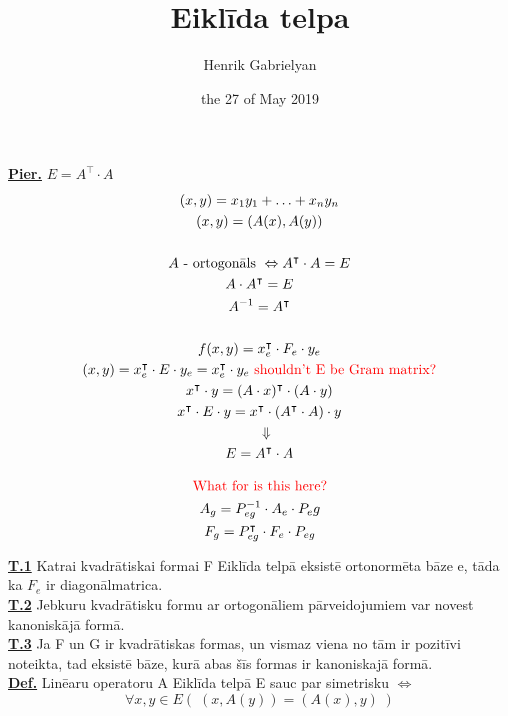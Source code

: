 \documentclass[12pt]{article}
\title{Eiklīda telpa}
\author{Henrik Gabrielyan}
\date{the 27 of May 2019}
\begin{document}
\maketitle

\textbf{\underline{Pier.}}  $E = A^{\intercal} \cdot A$
\begin{gather*}
	(x,y) = x_1y_1 + \ldots + x_ny_n  \\
	(x,y) = (A(x), A(y)) \\
	\\
	A \text{ - ortogonāls } \Leftrightarrow A^{\intercal} \cdot A = E \\ 
	A \cdot A^{\intercal} = E \\
	A^{-1} = A^{\intercal} \\
	\\
	f(x,y) = x_e^{\intercal} \cdot F_e \cdot y_e \\
	(x,y) = x_e^{\intercal} \cdot E \cdot y_e = x_e^{\intercal}  \cdot y_e \color{red}{\text{ shouldn't E be Gram matrix?} }\\ 
	x^{\intercal} \cdot y = (A \cdot x)^{\intercal} \cdot (A \cdot y) \\
	x^{\intercal} \cdot E \cdot y  = x^{\intercal} \cdot (A^{\intercal} \cdot A) \cdot y \\
	\quad \Downarrow \\
	E = A^{\intercal} \cdot A
\end{gather*}

\pagebreak

\begin{gather*}
	\text{\color{red}{What for is this here?}}\\
	A_g = P_{eg}^{-1} \cdot A_e \cdot P_eg \\
	F_g = P_{eg}^{\intercal} \cdot F_e \cdot P_{eg}
\end{gather*}

\textbf{\underline{T.1}} Katrai kvadrātiskai formai F Eiklīda telpā eksistē ortonormēta bāze e, tāda ka $F_e$ ir diagonālmatrica. \\
\textbf{\underline{T.2}} Jebkuru kvadrātisku formu ar ortogonāliem pārveidojumiem var novest kanoniskājā formā. \\ %
\textbf{\underline{T.3}}  Ja F un G ir kvadrātiskas formas, un vismaz viena no tām ir pozitīvi noteikta, tad eksistē bāze, kurā abas šīs formas ir kanoniskajā formā. \\

\textbf{\underline{Def.}} Linēaru operatoru A Eiklīda telpā E sauc par simetrisku $\Leftrightarrow$
$$
\forall x,y \in E ( \; (x,A(y))  =  (A(x),y) \;)
$$
\end{document}
